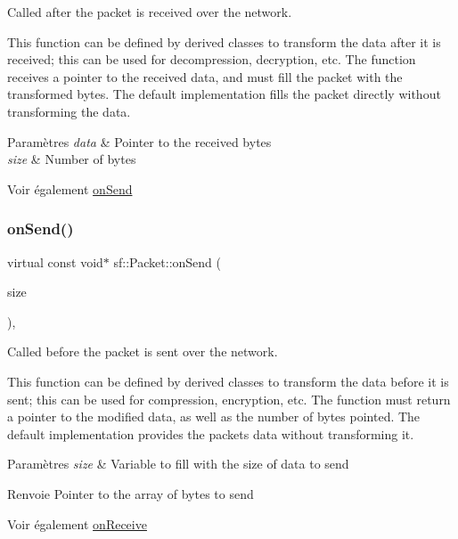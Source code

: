 Called after the packet is received over the network. 

This function can be defined by derived classes to transform the data after it is received; this can be used for decompression, decryption, etc. The function receives a pointer to the received data, and must fill the packet with the transformed bytes. The default implementation fills the packet directly without transforming the data.


\begin{DoxyParams}{Paramètres}
{\em data} & Pointer to the received bytes \\
\hline
{\em size} & Number of bytes\\
\hline
\end{DoxyParams}
\begin{DoxySeeAlso}{Voir également}
\hyperlink{classsf_1_1Packet_a052e955906c9bfd671622cb625380edc}{on\+Send} 
\end{DoxySeeAlso}
\mbox{\label{classsf_1_1Packet_a052e955906c9bfd671622cb625380edc}} 
\subsubsection{\texorpdfstring{on\+Send()}{onSend()}}
{\footnotesize\ttfamily virtual const void$\ast$ sf\+::\+Packet\+::on\+Send (\begin{DoxyParamCaption}\item[{std\+::size\+\_\+t \&}]{size }\end{DoxyParamCaption})\hspace{0.3cm}{\ttfamily [protected]}, {\ttfamily [virtual]}}



Called before the packet is sent over the network. 

This function can be defined by derived classes to transform the data before it is sent; this can be used for compression, encryption, etc. The function must return a pointer to the modified data, as well as the number of bytes pointed. The default implementation provides the packet\textquotesingle{}s data without transforming it.


\begin{DoxyParams}{Paramètres}
{\em size} & Variable to fill with the size of data to send\\
\hline
\end{DoxyParams}
\begin{DoxyReturn}{Renvoie}
Pointer to the array of bytes to send
\end{DoxyReturn}
\begin{DoxySeeAlso}{Voir également}
\hyperlink{classsf_1_1Packet_ab71a31ef0f1d5d856de6f9fc75434128}{on\+Receive} 
\end{DoxySeeAlso}
\mbox{\label{classsf_1_1Packet_a8ab20be4a63921b7cb1a4d8ca5c30f75}} 
